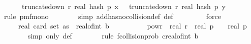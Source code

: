 \begin{isabellebody}
\ \ \ \ \ \ truncate{\isacharunderscore}{\kern0pt}down\ r\ {\isacharparenleft}{\kern0pt}real\ {\isacharparenleft}{\kern0pt}hash\ p\ x\ {\isasymomega}{\isacharparenright}{\kern0pt}{\isacharparenright}{\kern0pt}\ {\isacharequal}{\kern0pt}\ truncate{\isacharunderscore}{\kern0pt}down\ r\ {\isacharparenleft}{\kern0pt}real\ {\isacharparenleft}{\kern0pt}hash\ p\ y\ {\isasymomega}{\isacharparenright}{\kern0pt}{\isacharparenright}{\kern0pt}{\isacharparenright}{\kern0pt}{\isachardoublequoteclose}\ \isanewline
\ \ \ \ \ \ \isamarkupfalse%
\ {\isacharparenleft}{\kern0pt}rule\ pmf{\isacharunderscore}{\kern0pt}mono{\isacharunderscore}{\kern0pt}{}{\isacharparenright}{\kern0pt}\isanewline
\ \ \ \ \ \ \isamarkupfalse%
\ {\isacharparenleft}{\kern0pt}simp\ add{\isacharcolon}{\kern0pt}has{\isacharunderscore}{\kern0pt}no{\isacharunderscore}{\kern0pt}collision{\isacharunderscore}{\kern0pt}def\ {\isasymOmega}def{\isacharparenright}{\kern0pt}\ \isanewline
\ \ \ \ \ \ \isamarkupfalse%
\ force\isanewline
\ \ \ \ \isamarkupfalse%
\ \isamarkupfalse%
\ {\isachardoublequoteopen}{\isachardot}{\kern0pt}{\isachardot}{\kern0pt}{\isachardot}{\kern0pt}\ {\isasymle}\ {}\ {\isacharasterisk}{\kern0pt}\ {\isacharparenleft}{\kern0pt}real\ {\isacharparenleft}{\kern0pt}card\ {\isacharparenleft}{\kern0pt}set\ as{\isacharparenright}{\kern0pt}{\isacharparenright}{\kern0pt}{\isacharparenright}{\kern0pt}\ {\isacharasterisk}{\kern0pt}\ {\isacharparenleft}{\kern0pt}real{\isacharunderscore}{\kern0pt}of{\isacharunderscore}{\kern0pt}int\ b{\isacharparenright}{\kern0pt}\ \isanewline
\ \ \ \ \ \ \ {\isacharasterisk}{\kern0pt}\ {}\ powr\ {\isacharminus}{\kern0pt}\ real\ r\ {\isacharslash}{\kern0pt}\ {\isacharparenleft}{\kern0pt}real\ p{\isacharparenright}{\kern0pt}\ {\isacharplus}{\kern0pt}\ {}\ {\isacharslash}{\kern0pt}\ real\ p{\isachardoublequoteclose}\isanewline
\ \ \ \ \ \ \isamarkupfalse%
\ {\isacharparenleft}{\kern0pt}simp\ only{\isacharcolon}{\kern0pt}\ {\isasymOmega}def{\isacharparenright}{\kern0pt}\isanewline
\ \ \ \ \ \ \isamarkupfalse%
\ {\isacharparenleft}{\kern0pt}rule\ f{}{\isacharunderscore}{\kern0pt}collision{\isacharunderscore}{\kern0pt}prob{\isacharbrackleft}{\kern0pt}\ c{\isacharequal}{\kern0pt}{\isachardoublequoteopen}real{\isacharunderscore}{\kern0pt}of{\isacharunderscore}{\kern0pt}int\ b{\isachardoublequoteclose}{\isacharbrackright}{\kern0pt}{\isacharparenright}{\kern0pt}\isanewline

\end{isabellebody}
